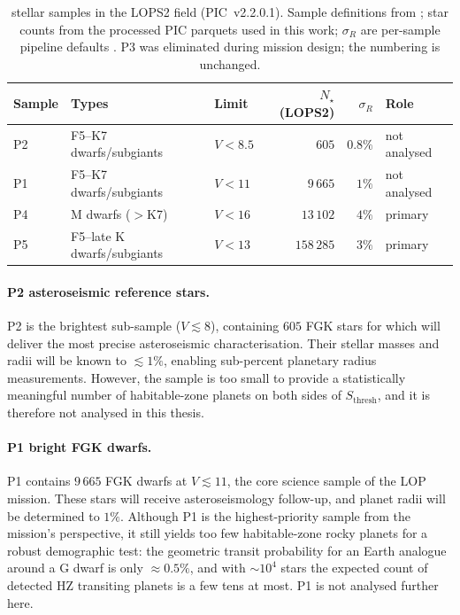 \begin{table}[H]
    \centering
    \caption[PLATO Input Catalog stellar samples]{%
        \PLATO stellar samples in the LOPS2 field (PIC~v2.2.0.1).
        Sample definitions from \textcite{Nascimbeni2022}; star counts
        from the processed PIC parquets used in this work; $\sigma_R$
        are per-sample pipeline defaults \parencite{ESA2017PLATO}.
        P3 was eliminated during mission design; the numbering is
        unchanged.}
    \label{tab:plato_samples}
    \begin{tabular}{lllrrl}
        \toprule
        Sample & Types & Limit & $N_\star$ (LOPS2) & $\sigma_R$ & Role \\
        \midrule
        P2 & F5--K7 dwarfs/subgiants & $V < 8.5$ & $605$     & $0.8\%$ & not analysed \\
        P1 & F5--K7 dwarfs/subgiants & $V < 11$  & $9\,665$  & $1\%$   & not analysed \\
        P4 & M dwarfs ($>$K7)        & $V < 16$  & $13\,102$ & $4\%$   & primary \\
        P5 & F5--late K dwarfs/subgiants & $V < 13$ & $158\,285$ & $3\%$ & primary \\
        \bottomrule
    \end{tabular}
\end{table}

\paragraph{P2 asteroseismic reference stars.}
P2 is the brightest sub-sample ($V \lesssim 8$), containing $605$ FGK
stars for which \PLATO will deliver the most precise asteroseismic
characterisation.  Their stellar masses and radii will be known to
$\lesssim 1\%$, enabling sub-percent planetary radius measurements.
However, the sample is too small to provide a statistically meaningful
number of habitable-zone planets on both sides of $S_\mathrm{thresh}$,
and it is therefore not analysed in this thesis.

\paragraph{P1 bright FGK dwarfs.}
P1 contains $9\,665$ FGK dwarfs at $V \lesssim 11$, the core science
sample of the \PLATO LOP mission.  These stars will receive
asteroseismology follow-up, and planet radii will be determined to $1\%$.
Although P1 is the highest-priority sample from the mission's perspective,
it still yields too few habitable-zone rocky planets for a robust
demographic test: the geometric transit probability for an Earth analogue
around a G dwarf is only $\approx 0.5\%$, and with $\sim 10^4$ stars the
expected count of detected HZ transiting planets is a few tens at most.
P1 is not analysed further here.

